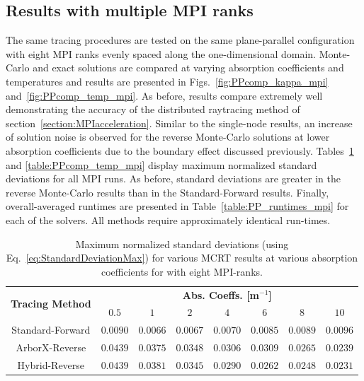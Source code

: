 \subsection{Results with multiple MPI ranks}
The same tracing procedures are tested on the same plane-parallel configuration with eight MPI ranks evenly spaced along the one-dimensional domain.
Monte-Carlo and exact solutions are compared at varying absorption coefficients and temperatures and results are presented in Figs.~\ref{fig:PPcomp_kappa_mpi} and~\ref{fig:PPcomp_temp_mpi}. As before, results compare extremely well demonstrating the accuracy of the distributed raytracing method of section~\ref{section:MPIacceleration}. Similar to the single-node results, an increase of solution noise is observed for the reverse Monte-Carlo solutions at lower absorption coefficients due to the boundary effect discussed previously. Tables~\ref{table:PPcomp_std_mpi} and \ref{table:PPcomp_temp_mpi} display maximum normalized standard deviations for all MPI runs. As before, standard deviations are greater in the reverse Monte-Carlo results than in the Standard-Forward results. Finally, overall-averaged runtimes are presented in Table~\ref{table:PP_runtimes_mpi} for each of the solvers. All methods require approximately identical run-times. 



\begin{table}
\centering
\caption{Maximum normalized standard deviations (using Eq.~\ref{eq:StandardDeviationMax}) for various MCRT results at various absorption coefficients for with eight MPI-ranks.}
\begin{tabular}{c c c c c c c c} 
\hline
\multirow{ 2}{*}{\bfseries Tracing Method} & 
\multicolumn{7}{c}{\bfseries Abs. Coeffs. [m$^{-1}$]} \\ [0.5ex] \cline{2-8}
 & $0.5$ & $1$ & $2$ & $4$ & $6$ & $8$ & $10$\\ [0.5ex]
 \hline
 Standard-Forward & $0.0090$ & $0.0066$ & $0.0067$ & $0.0070$ & $0.0085$ & $0.0089$ & $0.0096$\\ [0.5ex] 
 ArborX-Reverse & $0.0439$ & $0.0375$ & $0.0348$ & $0.0306$ & $0.0309$ & $0.0265$ & $0.0239$\\ [0.5ex] 
 Hybrid-Reverse & $0.0439$ & $0.0381$ & $0.0345$ & $0.0290$ & $0.0262$ & $0.0248$ & $0.0231$\\ [0.5ex] 
 \hline
\end{tabular}
\label{table:PPcomp_std_mpi}
\end{table}


